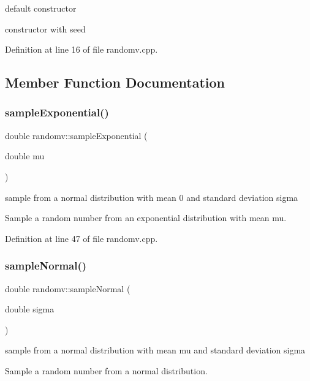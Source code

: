 default constructor 

constructor with seed 

Definition at line 16 of file randomv.\+cpp.



\subsection{Member Function Documentation}
\mbox{\label{classrandomv_afa56a12aa1bb44d7d4bd2a84303d9dca}} 
\subsubsection{\texorpdfstring{sample\+Exponential()}{sampleExponential()}}
{\footnotesize\ttfamily double randomv\+::sample\+Exponential (\begin{DoxyParamCaption}\item[{double}]{mu }\end{DoxyParamCaption})}



sample from a normal distribution with mean 0 and standard deviation sigma 

Sample a random number from an exponential distribution with mean mu. 

Definition at line 47 of file randomv.\+cpp.

\mbox{\label{classrandomv_a574eadd80c9cc66756c3417e55f2655c}} 
\subsubsection{\texorpdfstring{sample\+Normal()}{sampleNormal()}}
{\footnotesize\ttfamily double randomv\+::sample\+Normal (\begin{DoxyParamCaption}\item[{double}]{sigma }\end{DoxyParamCaption})}



sample from a normal distribution with mean mu and standard deviation sigma 

Sample a random number from a normal distribution. 

